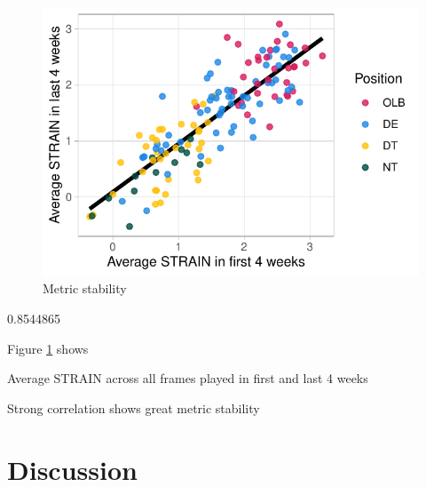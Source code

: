 \documentclass{statsoc}
\begin{document}
\begin{figure}

{\centering \includegraphics{paper_files/figure-latex/fig_stability-1} 

}

\caption{Metric stability}\label{fig:fig_stability}
\end{figure}

0.8544865

Figure \ref{fig:fig_stability} shows

Average STRAIN across all frames played in first and last 4 weeks

Strong correlation shows great metric stability

\hypertarget{discussion}{%
\section{Discussion}\label{discussion}}



\end{document}
